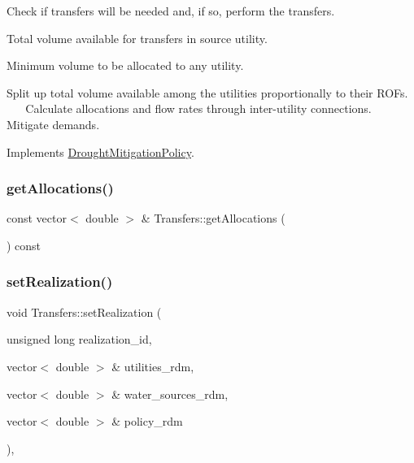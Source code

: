 Check if transfers will be needed and, if so, perform the transfers.

Total volume available for transfers in source utility.

Minimum volume to be allocated to any utility.

Split up total volume available among the utilities proportionally to their R\+O\+Fs. ~\newline
~\newline
 Calculate allocations and flow rates through inter-\/utility connections. ~\newline
 Mitigate demands. 

Implements \mbox{\hyperlink{classDroughtMitigationPolicy_a76c1a85eaf7707306fe173b6437cc31d_a76c1a85eaf7707306fe173b6437cc31d}{Drought\+Mitigation\+Policy}}.

\mbox{\label{classTransfers_a6c687c9f767ea915eead1f5db18711a2_a6c687c9f767ea915eead1f5db18711a2}} 
\subsubsection{\texorpdfstring{get\+Allocations()}{getAllocations()}}
{\footnotesize\ttfamily const vector$<$ double $>$ \& Transfers\+::get\+Allocations (\begin{DoxyParamCaption}{ }\end{DoxyParamCaption}) const}

\mbox{\label{classTransfers_a75342a7c14b2ff69eb2520de240a1131_a75342a7c14b2ff69eb2520de240a1131}} 
\subsubsection{\texorpdfstring{set\+Realization()}{setRealization()}}
{\footnotesize\ttfamily void Transfers\+::set\+Realization (\begin{DoxyParamCaption}\item[{unsigned long}]{realization\+\_\+id,  }\item[{vector$<$ double $>$ \&}]{utilities\+\_\+rdm,  }\item[{vector$<$ double $>$ \&}]{water\+\_\+sources\+\_\+rdm,  }\item[{vector$<$ double $>$ \&}]{policy\+\_\+rdm }\end{DoxyParamCaption})\hspace{0.3cm}{\ttfamily [override]}, {\ttfamily [virtual]}}



